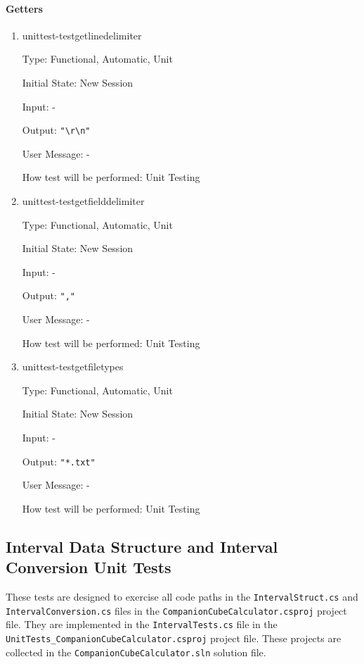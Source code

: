 \documentclass[12pt, titlepage]{article}
\begin{document}
\paragraph{Getters}
\begin{enumerate}
	\item{unittest-testgetlinedelimiter}
	
	Type: Functional, Automatic, Unit
	
	Initial State: New Session
	
	Input: -
	
	Output: \texttt{"\textbackslash r\textbackslash n"}
	
	User Message: - 
	
	How test will be performed: Unit Testing\\
	
	\item{unittest-testgetfielddelimiter}
	
	Type: Functional, Automatic, Unit
	
	Initial State: New Session
	
	Input: -
	
	Output: \texttt{","}
	
	User Message: - 
	
	How test will be performed: Unit Testing\\
	
	\item{unittest-testgetfiletypes}
	
	Type: Functional, Automatic, Unit
	
	Initial State: New Session
	
	Input: -
	
	Output: \texttt{"*.txt"}
	
	User Message: - 
	
	How test will be performed: Unit Testing\\
	
\end{enumerate}

\subsection{Interval Data Structure and Interval Conversion Unit Tests}
These tests are designed to exercise all code paths in the 
\texttt{IntervalStruct.cs} and \texttt{IntervalConversion.cs}
files in the \texttt{CompanionCubeCalculator.csproj} project file. They are 
implemented in the \texttt{IntervalTests.cs} file in the \\
\texttt{UnitTests\_CompanionCubeCalculator.csproj} project file. These projects 
are collected in the \texttt{CompanionCubeCalculator.sln} solution file.
\end{document}
